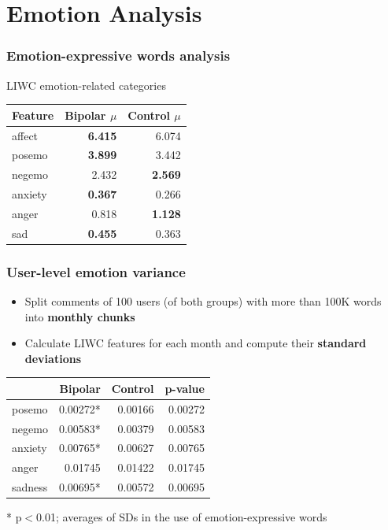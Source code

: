 \documentclass{beamer}
\begin{document}
\section{Emotion Analysis}
\begin{frame}
  \frametitle{Emotion-expressive words analysis}
  LIWC emotion-related categories
\begin{table}
\centering
{\small
\begin{tabular}{lrr}
\toprule
Feature & Bipolar $\mu$  & Control $\mu$ \\
\midrule
  affect & \textbf{6.415} & 6.074 \\
  posemo & \textbf{3.899} & 3.442 \\
  negemo & 2.432 & \textbf{2.569} \\
  anxiety & \textbf{0.367} & 0.266 \\
  anger & 0.818 & \textbf{1.128} \\
  sad & \textbf{0.455} & 0.363 \\
\bottomrule
\end{tabular}}
\end{table}
  
\end{frame}

\begin{frame}
  \frametitle{User-level emotion variance}
  \begin{itemize}
    \item Split comments of 100 users (of both groups) with more than 100K words into \textbf{monthly chunks}
    \item Calculate LIWC features for each month and compute their \textbf{standard deviations}
  \end{itemize}

  \pause

\begin{table}
\centering
{\small
\begin{tabular}{lrrr}
\toprule
        & Bipolar       & Control  & p-value     \\
\midrule
posemo  & 0.00272* & 0.00166 & 0.00272\\
negemo  & 0.00583*  & 0.00379 & 0.00583\\
anxiety & 0.00765* & 0.00627 & 0.00765\\
anger   & 0.01745\phantom{*}  & 0.01422 & 0.01745 \\
sadness & 0.00695* & 0.00572 & 0.00695\\
\bottomrule
\end{tabular}}
\end{table}
\centering
* p$<$0.01; averages of SDs in the use of emotion-expressive words

\end{frame}
\end{document}
